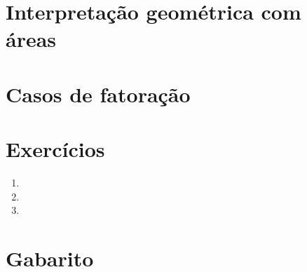 \documentclass[11pt,a4paper]{article}
\begin{document}
\section{Interpretação geométrica com áreas}

\section{Casos de fatoração}


\section{Exercícios}
\begin{enumerate}[label=\textbf{\arabic*.}]
  \item %
  \item %
  \item %
\end{enumerate}

\begin{desafio}
\end{desafio}

\section*{Gabarito}
\end{document}
